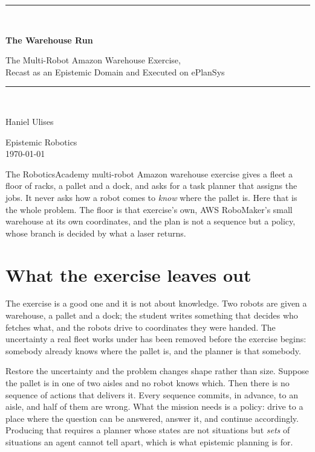 \documentclass[11pt,a4paper]{article}
\theoremstyle{definition}
\begin{document}
\begin{titlepage}
\centering
\vspace*{2.4cm}
{\color{rulegrey}\rule{\textwidth}{0.8pt}}\\[0.9cm]
{\LARGE\bfseries The Warehouse Run\par}
\vspace{0.5cm}
{\large\color{slate} The Multi-Robot Amazon Warehouse Exercise,\\ Recast as an Epistemic Domain and Executed on ePlanSys\par}
\vspace{0.7cm}
{\color{rulegrey}\rule{\textwidth}{0.8pt}}\\[1.4cm]

{\large Haniel Ulises\par}
\vspace{0.3cm}
{\color{slate} Epistemic Robotics}\\
\vspace{0.15cm}
{\color{slate}\today}

\vfill
{\color{slate}\small
The RoboticsAcademy multi-robot Amazon warehouse exercise gives a fleet a floor
of racks, a pallet and a dock, and asks for a task planner that assigns the
jobs. It never asks how a robot comes to \emph{know} where the pallet is. Here
that is the whole problem. The floor is that exercise's own, AWS RoboMaker's
small warehouse at its own coordinates, and the plan is not a sequence but a
policy, whose branch is decided by what a laser returns.}
\vspace{1.2cm}
\end{titlepage}

\section{What the exercise leaves out}

The exercise is a good one and it is not about knowledge. Two robots are given
a warehouse, a pallet and a dock; the student writes something that decides who
fetches what, and the robots drive to coordinates they were handed. The
uncertainty a real fleet works under has been removed before the exercise
begins: somebody already knows where the pallet is, and the planner is that
somebody.

Restore the uncertainty and the problem changes shape rather than size. Suppose
the pallet is in one of two aisles and no robot knows which. Then there is no
sequence of actions that delivers it. Every sequence commits, in advance, to an
aisle, and half of them are wrong. What the mission needs is a policy: drive to
a place where the question can be answered, answer it, and continue
accordingly. Producing that requires a planner whose states are not situations
but \emph{sets} of situations an agent cannot tell apart, which is what
epistemic planning is for.
\end{document}
